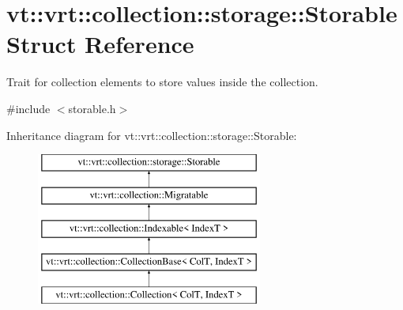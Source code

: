 \hypertarget{structvt_1_1vrt_1_1collection_1_1storage_1_1_storable}{}\section{vt\+:\+:vrt\+:\+:collection\+:\+:storage\+:\+:Storable Struct Reference}
\label{structvt_1_1vrt_1_1collection_1_1storage_1_1_storable}


Trait for collection elements to store values inside the collection.  




{\ttfamily \#include $<$storable.\+h$>$}

Inheritance diagram for vt\+:\+:vrt\+:\+:collection\+:\+:storage\+:\+:Storable\+:\begin{figure}[H]
\begin{center}
\leavevmode
\includegraphics[height=5.000000cm]{structvt_1_1vrt_1_1collection_1_1storage_1_1_storable}
\end{center}
\end{figure}
